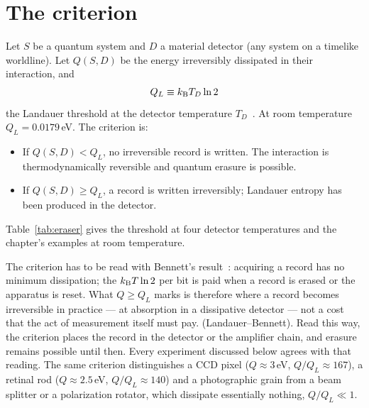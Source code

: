 \section{The criterion}\label{sec:mp_criterion}
Let $S$ be a quantum system and $D$ a material detector (any system on a timelike worldline). Let $Q(S,D)$ be the energy irreversibly dissipated in their
interaction, and
\begin{equation}
Q_L\equiv k_{\mathrm B} T_D\ln2\label{eq:mp_QL}
\end{equation}
the Landauer threshold at the detector temperature $T_D$~\cite{Landauer1961}. At room temperature $Q_L=0.0179$\,eV. \calc{} The criterion is:
\begin{itemize}
\item If $Q(S,D)<Q_L$, no irreversible record is written. The interaction is thermodynamically reversible and quantum erasure is possible.
\item If $Q(S,D)\ge Q_L$, a record is written irreversibly; Landauer entropy has been produced in the detector.
\end{itemize}
\conjecture{} Table~\ref{tab:eraser} gives the threshold at four detector temperatures and the chapter's examples at room temperature.


The criterion has to be read with Bennett's result~\cite{Bennett1982}: acquiring a record has no minimum dissipation; the $k_{\mathrm B} T\ln2$ per bit is paid when
a record is erased or the apparatus is reset. What $Q\ge Q_L$ marks is therefore where a record becomes irreversible in practice --- at absorption in a
dissipative detector --- not a cost that the act of measurement itself must pay. \derived{} (Landauer--Bennett). Read this way, the criterion places
the record in the detector or the amplifier chain, and erasure remains possible until then. Every experiment discussed below agrees with that reading.
\observed{} The same criterion distinguishes a CCD pixel ($Q\approx3$\,eV, $Q/Q_L\approx167$), a retinal rod ($Q\approx2.5$\,eV, $Q/Q_L\approx140$) and a
photographic grain from a beam splitter or a polarization rotator, which dissipate essentially nothing, $Q/Q_L\ll1$. \calc

